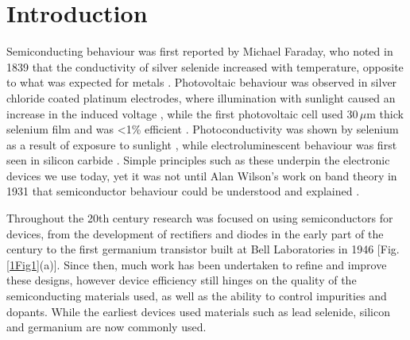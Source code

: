 
\chapter{Introduction}

\graphicspath{{Chapter1/Figures/}}

Semiconducting behaviour was first reported by Michael Faraday, who noted in 1839 that the conductivity of silver selenide increased with temperature, opposite to what was expected for metals \cite{Faraday2012}. Photovoltaic behaviour was observed in silver chloride coated platinum electrodes, where illumination with sunlight caused an increase in the induced voltage \cite{Becquerel1839}, while the first photovoltaic cell used 30\,$\mu$m thick selenium film and was <1\% efficient \cite{Fritts1883}. Photoconductivity was shown by selenium as a result of exposure to sunlight \cite{Smith1873, Adams1876}, while electroluminescent behaviour was first seen in silicon carbide \cite{Round1907}. Simple principles such as these underpin the electronic devices we use today, yet it was not until Alan Wilson's work on band theory in 1931 that semiconductor behaviour could be understood and explained \cite{Wilson1931}. 

Throughout the 20th century research was focused on using semiconductors for devices, from the development of rectifiers and diodes in the early part of the century to the first germanium transistor built at Bell Laboratories in 1946 [Fig.\,\ref{1Fig1}(a)]. Since then, much work has been undertaken to refine and improve these designs, however device efficiency still hinges on the quality of the semiconducting materials used, as well as the ability to control impurities and dopants. While the earliest devices used materials such as lead selenide, silicon and germanium are now commonly used.

